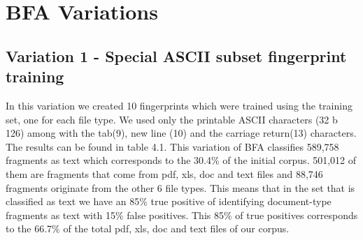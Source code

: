 \chapter{BFA Variations}

\section{Variation 1 - Special ASCII subset fingerprint training}
In this variation we created 10 fingerprints which were trained using the training set, one for each file type. We used only the printable ASCII characters (32 b 126) among with the tab(9), new line (10) and the carriage return(13) characters. The results can be found in table 4.1. This variation of BFA classifies 589,758 fragments as text which corresponds to the 30.4\% of the initial corpus. 501,012 of them are fragments that come from pdf, xls, doc and text files and 88,746 fragments originate from the other 6 file types. This means that in the set that is classified as text we have an 85\% true positive of identifying document-type fragments as text with 15\% false positives. This 85\% of true positives corresponds to the 66.7\% of the total pdf, xls, doc and text files of our corpus.



